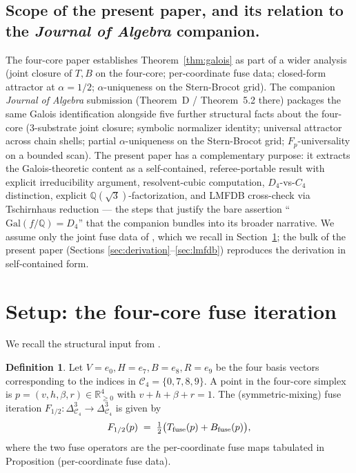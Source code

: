 \documentclass[11pt,reqno]{amsart}
\theoremstyle{plain}
\theoremstyle{definition}
\newtheorem{definition}[theorem]{Definition}
\theoremstyle{remark}
\newcommand{\Q}{\mathbb{Q}}
\newcommand{\R}{\mathbb{R}}
\newcommand{\Cfour}{\mathcal{C}_{4}}
\newcommand{\TS}{T}
\newcommand{\BH}{B}
\begin{document}
\subsection{Scope of the present paper, and its relation to the
\emph{Journal of Algebra} companion.}
The four-core paper \cite{SandersGishFourCore} establishes
Theorem~\ref{thm:galois} as part of a wider analysis (joint closure of
$\TS, \BH$ on the four-core; per-coordinate fuse data; closed-form
attractor at $\alpha = 1/2$; $\alpha$-uniqueness on the
Stern-Brocot grid). The companion \emph{Journal of Algebra} submission
\cite{SandersGishFourCoreJalg} (Theorem~D / Theorem~5.2 there) packages
the same Galois identification alongside five further structural facts
about the four-core (3-substrate joint closure; symbolic normalizer
identity; universal attractor across chain shells; partial
$\alpha$-uniqueness on the Stern-Brocot grid; $F_{p}$-universality on a
bounded scan). The present paper has a complementary purpose: it
extracts the Galois-theoretic content as a self-contained,
referee-portable result with explicit irreducibility argument,
resolvent-cubic computation, $D_{4}$-vs-$C_{4}$ distinction, explicit
$\Q(\sqrt{3})$-factorization, and LMFDB cross-check via Tschirnhaus
reduction --- the steps that justify the bare assertion
``$\mathrm{Gal}(f/\Q) = D_{4}$'' that the companion bundles into its
broader narrative. We assume only the joint fuse data of
\cite{SandersGishFourCore}, which we recall in
Section~\ref{sec:setup}; the bulk of the present paper (Sections
\ref{sec:derivation}--\ref{sec:lmfdb}) reproduces the derivation in
self-contained form.

\section{Setup: the four-core fuse iteration}
\label{sec:setup}

We recall the structural input from \cite{SandersGishFourCore}.

\begin{definition}\label{def:fourcore-iteration}
Let $V = e_{0}, H = e_{7}, B = e_{8}, R = e_{9}$ be the four basis
vectors corresponding to the indices in $\Cfour = \{0, 7, 8, 9\}$.
A point in the four-core simplex is $p = (v, h, \beta, r) \in
\R_{\geq 0}^{4}$ with $v + h + \beta + r = 1$.
The (symmetric-mixing) fuse iteration $F_{1/2}: \Delta^{3}_{\Cfour}
\to \Delta^{3}_{\Cfour}$ is given by
\[
  F_{1/2}(p) \;=\; \tfrac12\bigl(\TS_{\rm fuse}(p) + \BH_{\rm fuse}(p)\bigr),
\]
where the two fuse operators are the per-coordinate fuse maps tabulated
in \cite{SandersGishFourCore} Proposition (per-coordinate fuse data).
\end{definition}
\end{document}
